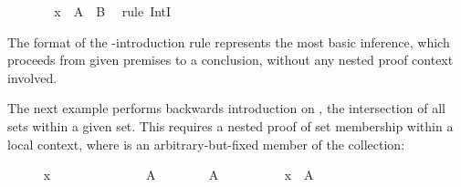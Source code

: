\begin{isabellebody}
\ \ \ \ \isamarkupfalse%
\ \isamarkupfalse%
\ {\isachardoublequoteopen}x\ {\isasymin}\ A\ {\isasyminter}\ B{\isachardoublequoteclose}\ \isamarkupfalse%
\ {\isacharparenleft}rule\ IntI{\isacharparenright}%
\endisatagproof
{\isafoldproof}%
%
\isadelimproof
%
\endisadelimproof
%
\begin{isamarkuptext}%
\noindent The format of the \isa{{\isachardoublequote}{\isasyminter}{\isachardoublequote}}-introduction rule represents
  the most basic inference, which proceeds from given premises to a
  conclusion, without any nested proof context involved.

  The next example performs backwards introduction on \isa{{\isachardoublequote}{\isasymInter}{\isasymA}{\isachardoublequote}},
  the intersection of all sets within a given set.  This requires a
  nested proof of set membership within a local context, where  is an arbitrary-but-fixed member of the collection:%
\end{isamarkuptext}%
\isamarkuptrue%
%
\medskip\begin{minipage}{0.6\textwidth}
%
\isadelimproof
%
\endisadelimproof
%
\isatagproof
\ \ \ \ \isamarkupfalse%
\ {\isachardoublequoteopen}x\ {\isasymin}\ {\isasymInter}{\isasymA}{\isachardoublequoteclose}\isanewline
\ \ \ \ \isamarkupfalse%
\isanewline
\ \ \ \ \ \ \isamarkupfalse%
\ A\isanewline
\ \ \ \ \ \ \isamarkupfalse%
\ {\isachardoublequoteopen}A\ {\isasymin}\ {\isasymA}{\isachardoublequoteclose}\isanewline
\ \ \ \ \ \ \isamarkupfalse%
\ {\isachardoublequoteopen}x\ {\isasymin}\ A{\isachardoublequoteclose}%
\endisatagproof
{\isafoldproof}%
%
\isadelimproof
%
\endisadelimproof
%
\isadelimnoproof
\ %
\endisadelimnoproof
%
\isatagnoproof
{}\isamarkupfalse%
%
\endisatagnoproof
{\isafoldnoproof}%
%
\isadelimnoproof
\isanewline
%
\endisadelimnoproof
%
\isadelimproof
\ \ \ \ %
\endisadelimproof
%
\isatagproof
{}\isamarkupfalse%
%
\endisatagproof
{\isafoldproof}%
%
\isadelimproof
%
\endisadelimproof
%
\end{minipage}\begin{minipage}{0.4\textwidth}
%
\begin{isamarkuptext}%
%

\end{isamarkuptext}
\end{minipage}
\end{isabellebody}
